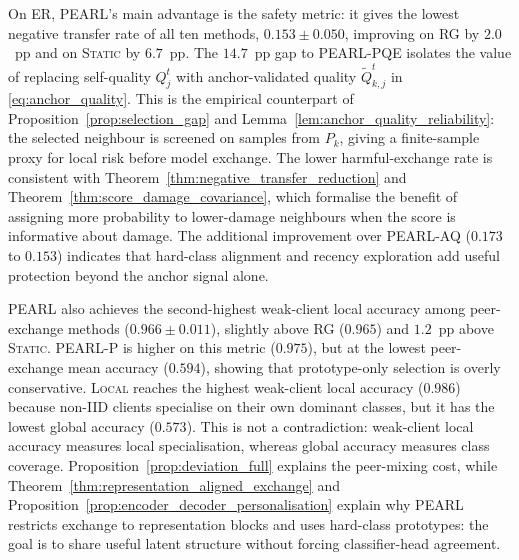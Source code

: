 \documentclass[conference]{IEEEtran}
\begin{document}
On ER, \textsc{PEARL}'s main advantage is the safety metric: it gives the lowest negative transfer rate of all ten methods, $0.153\pm0.050$, improving on \textsc{RG} by $2.0$~pp and on \textsc{Static} by $6.7$~pp. The $14.7$~pp gap to \textsc{PEARL-PQE} isolates the value of replacing self-quality \(Q_j^t\) with anchor-validated quality \(\tilde{Q}_{k,j}^t\) in \eqref{eq:anchor_quality}. This is the empirical counterpart of Proposition~\ref{prop:selection_gap} and Lemma~\ref{lem:anchor_quality_reliability}: the selected neighbour is screened on samples from \(P_k\), giving a finite-sample proxy for local risk before model exchange. The lower harmful-exchange rate is consistent with Theorem~\ref{thm:negative_transfer_reduction} and Theorem~\ref{thm:score_damage_covariance}, which formalise the benefit of assigning more probability to lower-damage neighbours when the score is informative about damage. The additional improvement over \textsc{PEARL-AQ} ($0.173$ to $0.153$) indicates that hard-class alignment and recency exploration add useful protection beyond the anchor signal alone.

\textsc{PEARL} also achieves the second-highest weak-client local accuracy among peer-exchange methods ($0.966\pm0.011$), slightly above \textsc{RG} ($0.965$) and $1.2$~pp above \textsc{Static}. \textsc{PEARL-P} is higher on this metric ($0.975$), but at the lowest peer-exchange mean accuracy ($0.594$), showing that prototype-only selection is overly conservative. \textsc{Local} reaches the highest weak-client local accuracy ($0.986$) because non-IID clients specialise on their own dominant classes, but it has the lowest global accuracy ($0.573$). This is not a contradiction: weak-client local accuracy measures local specialisation, whereas global accuracy measures class coverage. Proposition~\ref{prop:deviation_full} explains the peer-mixing cost, while Theorem~\ref{thm:representation_aligned_exchange} and Proposition~\ref{prop:encoder_decoder_personalisation} explain why PEARL restricts exchange to representation blocks and uses hard-class prototypes: the goal is to share useful latent structure without forcing classifier-head agreement.
\end{document}
